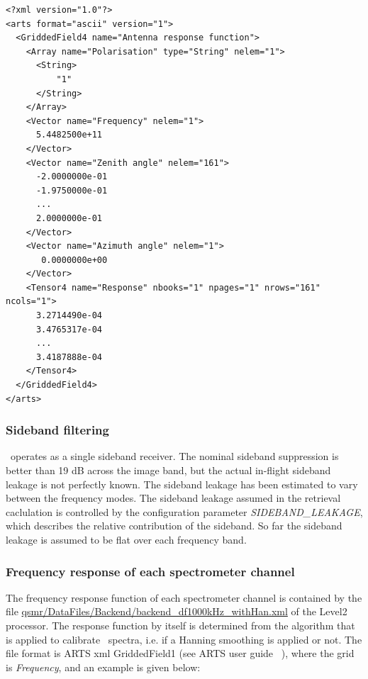 %
\lstset{language=XML}
\begin{lstlisting}
<?xml version="1.0"?>
<arts format="ascii" version="1">
  <GriddedField4 name="Antenna response function">
    <Array name="Polarisation" type="String" nelem="1">
      <String>
          "1"
      </String>
    </Array>
    <Vector name="Frequency" nelem="1">
      5.4482500e+11
    </Vector>
    <Vector name="Zenith angle" nelem="161">
      -2.0000000e-01
      -1.9750000e-01
      ...
      2.0000000e-01
    </Vector>
    <Vector name="Azimuth angle" nelem="1">     
       0.0000000e+00
    </Vector>
    <Tensor4 name="Response" nbooks="1" npages="1" nrows="161" ncols="1">
      3.2714490e-04
      3.4765317e-04 
      ...
      3.4187888e-04 
    </Tensor4>
  </GriddedField4>
</arts>
\end{lstlisting}

\subsubsection*{Sideband filtering}


\smr\ operates as a single sideband receiver. The nominal sideband suppression
is better than 19 dB across the image band, but the actual in-flight sideband
leakage is not perfectly known. The sideband leakage has been estimated to vary
between the frequency modes. The sideband leakage assumed in the retrieval
caclulation is controlled by the configuration parameter
\emph{SIDEBAND\_LEAKAGE}, which describes the relative contribution of the
sideband. So far the sideband leakage is assumed to be flat over each frequency
band.

\subsubsection*{Frequency response of each spectrometer channel}

The frequency response function of each spectrometer channel is contained by
the file \url{qsmr/DataFiles/Backend/backend\_df1000kHz\_withHan.xml} of the
Level2 processor. The response function by itself is determined from the
algorithm that is applied to calibrate \smr\ spectra, i.e. if a Hanning
smoothing is applied or not. The file format is ARTS xml GriddedField1 (see
ARTS user guide ~\citep{artsug}), where the grid is \emph{Frequency}, and an
example is given below:

